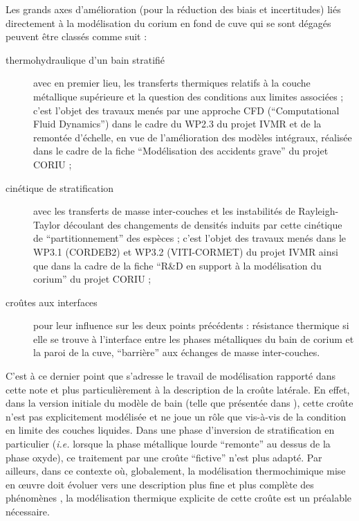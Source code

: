 Les grands axes d'amélioration (pour la réduction des biais et incertitudes) liés directement à la modélisation du corium en fond de cuve qui se sont dégagés peuvent être classés comme suit \cite{LeTellier2014,Fichot2018} :
\begin{description}
 \item[thermohydraulique d'un bain stratifié] avec en premier lieu, les transferts thermiques relatifs à la couche métallique supérieure et la question des conditions aux limites associées ; c'est l'objet des travaux menés par une approche CFD (``Computational Fluid Dynamics'') dans le cadre du WP2.3 du projet IVMR et de la remontée d'échelle, en vue de l'amélioration des modèles intégraux, réalisée dans le cadre de la fiche ``Modélisation des accidents grave'' du projet CORIU ; 
 \item[cinétique de stratification] avec les transferts de masse inter-couches et les instabilités de Rayleigh-Taylor découlant des changements de densités induits par cette cinétique de ``partitionnement'' des espèces ; c'est l'objet des travaux menés dans le WP3.1 (CORDEB2) et WP3.2 (VITI-CORMET) du projet IVMR ainsi que dans la cadre de la fiche ``R\&D en support à la modélisation du corium'' du projet CORIU ;
 \item[croûtes aux interfaces] pour leur influence sur les deux points précédents : résistance thermique si elle se trouve à l'interface entre les phases métalliques du bain de corium et la paroi de la cuve, ``barrière'' aux échanges de masse inter-couches.
\end{description}
C'est à ce dernier point que s'adresse le travail de modélisation rapporté dans cette note et plus particulièrement à la description de la croûte latérale. En effet, dans la version initiale du modèle de bain (telle que présentée dans \cite{LeTellier2014}), cette croûte n'est pas explicitement modélisée et ne joue un rôle que vis-à-vis de la condition en limite des couches liquides. Dans une phase d'inversion de stratification en particulier (\textit{i.e.} lorsque la phase métallique lourde ``remonte'' au dessus de la phase oxyde), ce traitement par une croûte ``fictive'' n'est plus adapté. Par ailleurs, dans ce contexte où, globalement, la modélisation thermochimique mise en \oe uvre doit évoluer vers une description plus fine et plus complète des phénomènes \cite{Fichot2015}, la modélisation thermique explicite de cette croûte est un préalable nécessaire. 

